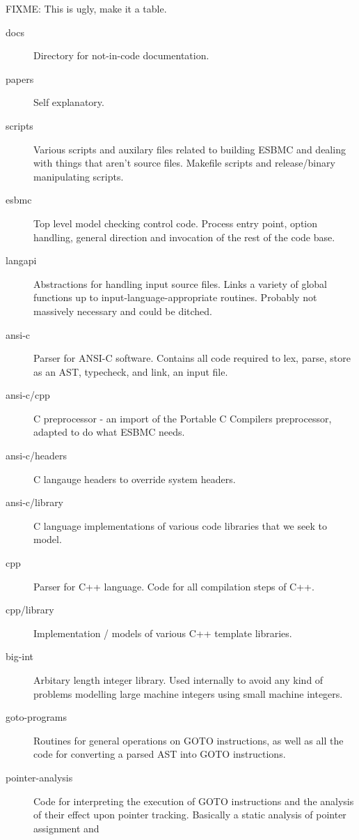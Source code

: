 \documentclass{article}
\begin{document}
FIXME: This is ugly, make it a table.

\begin{description}
\item[docs] Directory for not-in-code documentation.
\item[papers] Self explanatory.
\item[scripts] Various scripts and auxilary files related to building ESBMC
               and dealing with things that aren't source files. Makefile
               scripts and release/binary manipulating scripts.
\item[esbmc] Top level model checking control code. Process entry point,
             option handling, general direction and invocation of the rest
             of the code base.
\item[langapi] Abstractions for handling input source files. Links a variety
               of global functions up to input-language-appropriate routines.
               Probably not massively necessary and could be ditched.
\item[ansi-c] Parser for ANSI-C software. Contains all code required to lex,
              parse, store as an AST, typecheck, and link, an input file.
\item[ansi-c/cpp] C preprocessor - an import of the Portable C Compilers
                  preprocessor, adapted to do what ESBMC needs.
\item[ansi-c/headers] C langauge headers to override system headers.
\item[ansi-c/library] C language implementations of various code libraries
                      that we seek to model.
\item[cpp] Parser for C++ language. Code for all compilation steps of C++.
\item[cpp/library] Implementation / models of various C++ template libraries.
\item[big-int] Arbitary length integer library. Used internally to avoid any
               kind of problems modelling large machine integers using small
               machine integers.
\item[goto-programs] Routines for general operations on GOTO instructions, as
                     well as all the code for converting a parsed AST into
                     GOTO instructions.
\item[pointer-analysis] Code for interpreting the execution of GOTO instructions
                        and the analysis of their effect upon pointer tracking.
                        Basically a static analysis of pointer assignment and

\end{description}
\end{document}
